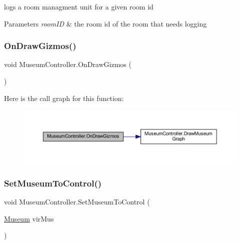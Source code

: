 logs a room managment unit for a given room id 


\begin{DoxyParams}{Parameters}
{\em room\+ID} & the room id of the room that needs logging\\
\hline
\end{DoxyParams}
\mbox{\label{class_museum_controller_a09d2311468a7d9359368ddb266cdf898}} 
\subsubsection{\texorpdfstring{On\+Draw\+Gizmos()}{OnDrawGizmos()}}
{\footnotesize\ttfamily void Museum\+Controller.\+On\+Draw\+Gizmos (\begin{DoxyParamCaption}{ }\end{DoxyParamCaption})\hspace{0.3cm}{\ttfamily [private]}}

Here is the call graph for this function\+:
\nopagebreak
\begin{figure}[H]
\begin{center}
\leavevmode
\includegraphics[width=350pt]{class_museum_controller_a09d2311468a7d9359368ddb266cdf898_cgraph}
\end{center}
\end{figure}
\mbox{\label{class_museum_controller_a276d26ec047cda4e6f36b29fb673d968}} 
\subsubsection{\texorpdfstring{Set\+Museum\+To\+Control()}{SetMuseumToControl()}}
{\footnotesize\ttfamily void Museum\+Controller.\+Set\+Museum\+To\+Control (\begin{DoxyParamCaption}\item[{\mbox{\hyperlink{class_museum}{Museum}}}]{vir\+Mus }\end{DoxyParamCaption})}



